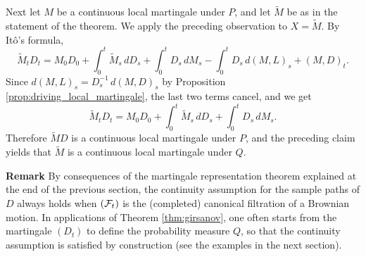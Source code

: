 \documentclass[../Main.tex]{subfiles}
\begin{document}
{Next let \(M\) be a continuous local martingale under \(P\), and let
\(\tilde M\) be as in the statement of the theorem. We apply the
preceding observation to \(X=\tilde M\). By Itô's formula,
\[
\tilde M_t D_t
= M_0D_0 + \int_0^t \tilde M_s\,dD_s
+ \int_0^t D_s\,dM_s
- \int_0^t D_s\,d(M,L)_s + (M,D)_t.
\]
Since \(d(M,L)_s = D_s^{-1}\,d(M,D)_s\) by Proposition
\ref{prop:driving_local_martingale}, the last two terms cancel, and we get
\[
\tilde M_t D_t
= M_0D_0 + \int_0^t \tilde M_s\,dD_s
+ \int_0^t D_s\,dM_s.
\]
Therefore \(\tilde M D\) is a continuous local martingale under \(P\), and
the preceding claim yields that \(\tilde M\) is a continuous local
martingale under \(Q\).
}

\textbf{Remark} By consequences of the martingale representation theorem explained at the end of the previous section, the continuity assumption for the sample paths of $D$ always holds when $(\mathcal{F}_t)$ is the (completed) canonical filtration of a Brownian motion. In applications of Theorem \ref{thm:girsanov}, one often starts from the martingale $(D_t)$ to define the probability measure $Q$, so that the continuity assumption is satisfied by construction (see the examples in the next section).
\end{document}

